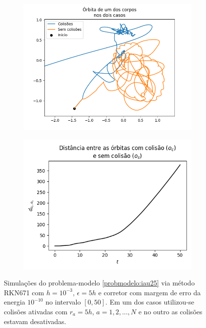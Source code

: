 \begin{figure}
    \centering
    \begin{subfigure}{.5\textwidth}
      \centering
      \includegraphics[width=\linewidth]{tcc/img/trajetoria_iau25_colisao_vs_sem_colisao.png}
      \caption{}
      \label{fig:iau25_trajetorias_colisoes_a}
    \end{subfigure}%
    \begin{subfigure}{.5\textwidth}
      \centering
      \includegraphics[width=\linewidth]{tcc/img/distancia_orbitas_iau25.png}
      \caption{}
      \label{fig:iau25_trajetorias_colisoes_b}
    \end{subfigure}
    
    \caption{Simulações do problema-modelo \ref{probmodelo:iau25} via método RKN671 com $h=10^{-3}$, $\epsilon=5h$ e corretor com margem de erro da energia $10^{-10}$ no intervalo $[0,50]$. Em um dos casos utilizou-se colisões ativadas com $r_a = 5h$, $a=1,2,...,N$ e no outro as colisões estavam desativadas.}
    \label{fig:iau25_trajetorias_colisoes}
\end{figure}